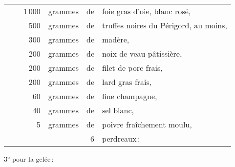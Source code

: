 \footnotesize
\begin{longtable}{rrrrrp{18em}}
 & \hspace{2em} & 1 000 & grammes  & de & foie gras d'oie, blanc rosé,                                    \\
 & \hspace{2em} &   500 & grammes  & de & truffes noires du Périgord, au moins,                           \\
 & \hspace{2em} &   300 & grammes  & de & madère,                                                         \\
 & \hspace{2em} &   200 & grammes  & de & noix de veau pâtissière,                                        \\
 & \hspace{2em} &   200 & grammes  & de & filet de porc frais,                                            \\
 & \hspace{2em} &   200 & grammes  & de & lard gras frais,                                                \\
 & \hspace{2em} &    60 & grammes  & de & fine champagne,                                                 \\
 & \hspace{2em} &    40 & grammes  & de & sel blanc,                                                      \\
 & \hspace{2em} &     5 & grammes  & de & poivre fraîchement moulu,                                       \\
 & \hspace{2em} &       &          &  6 & perdreaux ;                                                     \\
\end{longtable}
\normalsize

3° pour la gelée :

